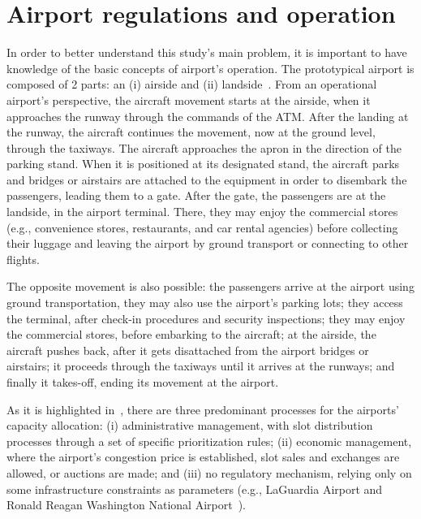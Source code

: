 \section{Airport regulations and operation}
\label{sec:Airport_regulations_and_operation}


In order to better understand this study's main problem, it is important to have
knowledge of the basic concepts of airport’s operation.
%
The prototypical airport is composed of 2 parts: an (i) airside and (ii)
landside~\cite{Lance2009}.
%
From an operational airport’s perspective, the aircraft movement starts at the
airside, when it approaches the runway through the commands of the
\acrfull{ATM}.
%
After the landing at the runway, the aircraft continues the movement, now at the
ground level, through the taxiways.
%
The aircraft approaches the apron in the direction of the parking stand.
%
When it is positioned at its designated stand, the aircraft parks and bridges or
airstairs are attached to the equipment in order to disembark the passengers,
leading them to a gate.
%
After the gate, the passengers are at the landside, in the airport terminal.
%
There, they may enjoy the commercial stores (e.g., convenience stores,
restaurants, and car rental agencies) before collecting their luggage and
leaving the airport by ground transport or connecting to other flights.
%



The opposite movement is also possible: the passengers arrive at the airport
using ground transportation, they may also use the airport’s parking lots; they
access the terminal, after check-in procedures and security inspections; they
may enjoy the commercial stores, before embarking to the aircraft; at the
airside, the aircraft pushes back, after it gets disattached from the airport
bridges or airstairs; it proceeds through the taxiways until it arrives at the
runways; and finally it takes-off, ending its movement at the airport.
%



As it is highlighted in~\cite{cavusoglu2021minimum}, there are three predominant
processes for the airports’ capacity allocation: (i) administrative management,
with slot distribution processes through a set of specific prioritization rules;
(ii) economic management, where the airport’s congestion price is established,
slot sales and exchanges are allowed, or auctions are made; and (iii) no
regulatory mechanism, relying only on some infrastructure constraints as
parameters (e.g., LaGuardia Airport and Ronald Reagan Washington National
Airport~\cite{FAAslots}).



